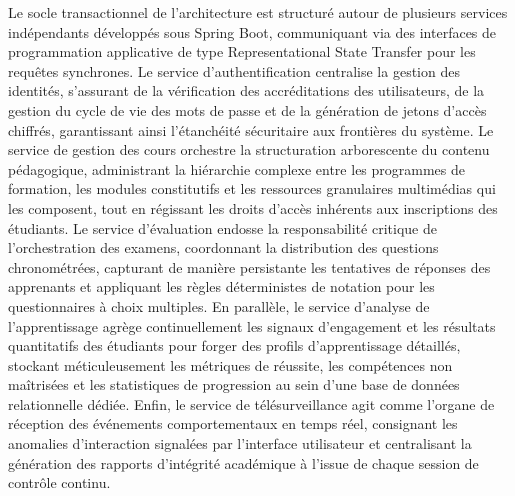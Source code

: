 Le socle transactionnel de l'architecture est structuré autour de plusieurs services indépendants développés sous Spring Boot, communiquant via des interfaces de programmation applicative de type Representational State Transfer pour les requêtes synchrones. Le service d'authentification centralise la gestion des identités, s'assurant de la vérification des accréditations des utilisateurs, de la gestion du cycle de vie des mots de passe et de la génération de jetons d'accès chiffrés, garantissant ainsi l'étanchéité sécuritaire aux frontières du système. Le service de gestion des cours orchestre la structuration arborescente du contenu pédagogique, administrant la hiérarchie complexe entre les programmes de formation, les modules constitutifs et les ressources granulaires multimédias qui les composent, tout en régissant les droits d'accès inhérents aux inscriptions des étudiants. Le service d'évaluation endosse la responsabilité critique de l'orchestration des examens, coordonnant la distribution des questions chronométrées, capturant de manière persistante les tentatives de réponses des apprenants et appliquant les règles déterministes de notation pour les questionnaires à choix multiples. En parallèle, le service d'analyse de l'apprentissage agrège continuellement les signaux d'engagement et les résultats quantitatifs des étudiants pour forger des profils d'apprentissage détaillés, stockant méticuleusement les métriques de réussite, les compétences non maîtrisées et les statistiques de progression au sein d'une base de données relationnelle dédiée. Enfin, le service de télésurveillance agit comme l'organe de réception des événements comportementaux en temps réel, consignant les anomalies d'interaction signalées par l'interface utilisateur et centralisant la génération des rapports d'intégrité académique à l'issue de chaque session de contrôle continu.

